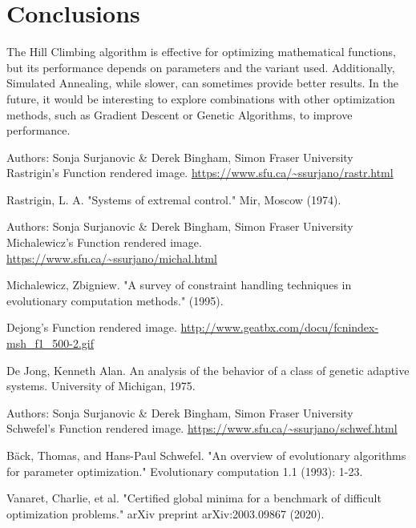 \documentclass{article}
\begin{document}
\section{Conclusions}
The Hill Climbing algorithm is effective for optimizing mathematical functions, but its performance depends on parameters and the variant used. Additionally, Simulated Annealing, while slower, can sometimes provide better results. In the future, it would be interesting to explore combinations with other optimization methods, such as Gradient Descent or Genetic Algorithms, to improve performance.







\begin{thebibliography}{9}

Authors: Sonja Surjanovic \& Derek Bingham, Simon Fraser University \\ Rastrigin's Function rendered image.
  \url{https://www.sfu.ca/~ssurjano/rastr.html}

  Rastrigin, L. A. "Systems of extremal control." Mir, Moscow (1974).

Authors: Sonja Surjanovic \& Derek Bingham, Simon Fraser University \\ Michalewicz's Function rendered image.
  \url{https://www.sfu.ca/~ssurjano/michal.html}

    Michalewicz, Zbigniew. "A survey of constraint handling techniques in evolutionary computation methods." (1995).

Dejong's Function rendered image.
  \url{http://www.geatbx.com/docu/fcnindex-msh_f1_500-2.gif}

De Jong, Kenneth Alan. An analysis of the behavior of a class of genetic adaptive systems. University of Michigan, 1975.

Authors: Sonja Surjanovic \& Derek Bingham, Simon Fraser University \\ Schwefel's Function rendered image.
  \url{https://www.sfu.ca/~ssurjano/schwef.html}

Bäck, Thomas, and Hans-Paul Schwefel. "An overview of evolutionary algorithms for parameter optimization." Evolutionary computation 1.1 (1993): 1-23.

Vanaret, Charlie, et al. "Certified global minima for a benchmark of difficult optimization problems." arXiv preprint arXiv:2003.09867 (2020).


\end{thebibliography} 
\end{document}
